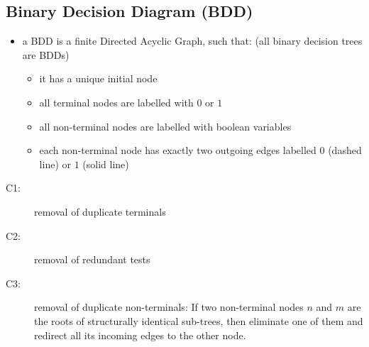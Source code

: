 \documentclass[a4paper, 10pt]{article}
\begin{document}
\subsection{Binary Decision Diagram (BDD)}
\begin{mdframed}[roundcorner=5pt,
subtitlebelowline=false,subtitleaboveline=false,
subtitlebackgroundcolor=blue!30,
frametitlerule=true,
frametitlebackgroundcolor=blue!30,
frametitle={Binary Decision Diagram (BDD)}
]
\begin{multicols}{2}
\begin{itemize}
    \item a BDD is a finite Directed Acyclic Graph, such that: {\tiny (all binary decision trees are BDDs)}
    \begin{itemize}
        \item it has a unique initial node
        \item all terminal nodes are labelled with $0$ or $1$
        \item all non-terminal nodes are labelled with boolean variables
        \item each non-terminal node has exactly two outgoing edges labelled $0$ (dashed line) or $1$ (solid line)
    \end{itemize}
\end{itemize}
\begin{center}
\scalebox{1}{}
\end{center}
\end{multicols}
\begin{multicols}{2}
\begin{description}
    \item[C1:] removal of duplicate terminals
    \begin{center}
    \scalebox{1}{}
    \end{center}
    \item[C2:] removal of redundant tests
    \begin{center}
    \scalebox{1}{}
    \end{center}
    \columnbreak
    \item[C3:] removal of duplicate non-terminals: If two non-terminal nodes $n$ and $m$ are the roots of structurally identical sub-trees, then eliminate one of them and redirect all its incoming edges to the other node.
    \begin{center}
    \scalebox{1}{}

\end{center}
\end{description}
\end{multicols}
\end{mdframed}
\end{document}
